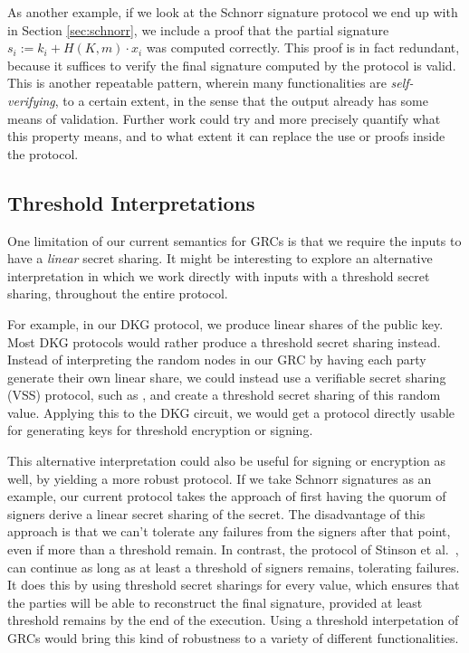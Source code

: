 As another example, if we look at the Schnorr signature
protocol we end up with in Section \ref{sec:schnorr},
we include a proof that the partial signature $s_i := k_i + H(K, m) \cdot x_i$
was computed correctly.
This proof is in fact redundant, because it suffices to verify
the final signature computed by the protocol is valid.
This is another repeatable pattern, wherein many functionalities
are \emph{self-verifying}, to a certain extent,
in the sense that the output already has some means of validation.
Further work could try and more precisely quantify what
this property means, and to what extent it can replace the use
or proofs inside the protocol.

\subsection{Threshold Interpretations}

One limitation of our current semantics for GRCs is that we require
the inputs to have a \emph{linear} secret sharing.
It might be interesting to explore an alternative interpretation
in which we work directly with inputs with a threshold secret sharing,
throughout the entire protocol.

For example, in our DKG protocol, we produce linear shares
of the public key.
Most DKG protocols would rather produce a threshold secret sharing
instead.
Instead of interpreting the random nodes in our GRC
by having each party generate their own linear share, we could
instead use a verifiable secret sharing (VSS) protocol,
such as \cite{feldman_practical_1987}, and create a threshold
secret sharing of this random value.
Applying this to the DKG circuit, we would get a protocol
directly usable for generating keys for threshold encryption
or signing.

This alternative interpretation could also be useful
for signing or encryption as well, by yielding a more robust protocol.
If we take Schnorr signatures as an example,
our current protocol takes the approach of first having the quorum
of signers derive a linear secret sharing of the secret.
The disadvantage of this approach is that we can't tolerate
any failures from the signers after that point,
even if more than a threshold remain.
In contrast, the protocol of Stinson et al.~\cite{stinson_provably_2001},
can continue as long as at least a threshold of signers
remains, tolerating failures.
It does this by using threshold secret sharings for every value,
which ensures that the parties will be able to reconstruct
the final signature, provided at least threshold remains
by the end of the execution.
Using a threshold interpetation of GRCs would bring this
kind of robustness to a variety of different functionalities.

